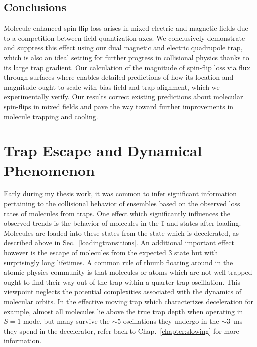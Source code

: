 \subsection{Conclusions}

Molecule enhanced spin-flip loss arises in mixed electric and magnetic fields due to a competition between field quantization axes.
We conclusively demonstrate and suppress this effect using our dual magnetic and electric quadrupole trap, which is also an ideal setting for further progress in collisional physics thanks to its large trap gradient.
Our calculation of the magnitude of spin-flip loss via flux through surfaces where \epb{} enables detailed predictions of how its location and magnitude ought to scale with bias field and trap alignment, which we experimentally verify.
Our results correct existing predictions about molecular spin-flips in mixed fields and pave the way toward further improvements in molecule trapping and cooling.

\section{Trap Escape and Dynamical Phenomenon}

Early during my thesis work, it was common to infer significant information pertaining to the collisional behavior of ensembles based on the observed loss rates of molecules from traps.
One effect which significantly influences the observed trends is the behavior of molecules in the \f1 and  states after loading.
Molecules are loaded into these states from the  state which is decelerated, as described above in Sec.~\ref{loadingtransitions}.
An additional important effect however is the escape of molecules from the expected \f3 state but with surprisingly long lifetimes.
A common rule of thumb floating around in the atomic physics community is that molecules or atoms which are not well trapped ought to find their way out of the trap within a quarter trap oscillation.
This viewpoint neglects the potential complexities associated with the dynamics of molecular orbits.
In the effective moving trap which characterizes deceleration for example, almost all molecules lie above the true trap depth when operating in $S=1$ mode, but many survive the $\sim5$ oscillations they undergo in the $\sim3$~ms they spend in the decelerator, refer back to Chap.~\ref{chapter:slowing} for more information.

